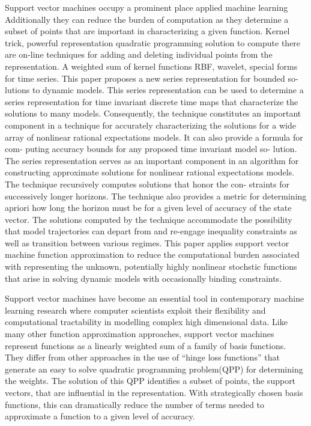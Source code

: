 \documentclass[12pt]{article}
\begin{document}
Support vector machines occupy a prominent place applied machine learning
Additionally they can reduce the burden of computation as they determine 
a subset of points that are important in characterizing a given function.
Kernel trick,  powerful representation quadratic programming solution to compute there are on-line techniques for adding and deleting individual points from the representation.  A weighted sum of kernel functions RBF, wavelet, special forms for time series.
  This paper proposes a new series representation for bounded so-
lutions to dynamic models. This series representation can be used
to determine a series representation for time invariant discrete time
maps that characterize the solutions to many models. Consequently,
the technique constitutes an important component in a technique for
accurately characterizing the solutions for a wide array of nonlinear
rational expectations models. It can also provide a formula for com-
puting accuracy bounds for any proposed time invariant model so-
lution. The series representation serves as an important component
in an algorithm for constructing approximate solutions for nonlinear
rational expectations models.
The technique recursively computes solutions that honor the con-
straints for successively longer horizons. The technique also provides
a metric for determining apriori how long the horizon must be for a
given level of accuracy of the state vector. The solutions computed by
the technique accommodate the possibility that model trajectories can
depart from and re-engage inequality constraints as well as transition
between various regimes.
This paper applies support vector machine function approximation to
reduce the computational burden associated with representing the
unknown, potentially highly nonlinear stochstic functions that arise in
solving dynamic models with occasionally binding constraints.


Support vector machines 
have become an essential tool in contemporary machine learning research
where computer scientists exploit their flexibility and
computational tractability in modelling complex high dimensional data.
Like many other function approximation approaches,
support vector machines represent functions as a linearly weighted sum
of a family of basis functions.  They differ from other approaches in  the
use of ``hinge loss functions'' that generate
an easy to solve
quadratic programming problem(QPP) for determining the weights.
The solution of this QPP identifies a subset of points, the support vectors,
that are influential in the representation.  With strategically chosen
basis functions, this can dramatically reduce the number of terms needed
to approximate a function to a given level of accuracy.






\end{document}
